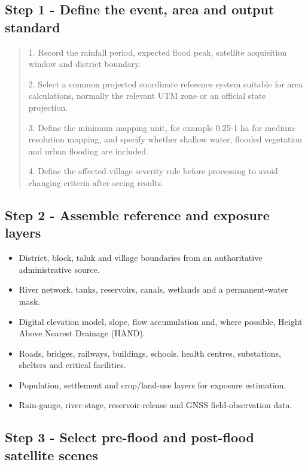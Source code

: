 \documentclass[11pt,a4paper]{article}
\begin{document}
\subsection{Step 1 - Define the event, area and output standard}\label{step-1---define-the-event-area-and-output-standard}

\begin{quote}
1. Record the rainfall period, expected flood peak, satellite acquisition window and district boundary.

2. Select a common projected coordinate reference system suitable for area calculations, normally the relevant UTM zone or an official state projection.

3. Define the minimum mapping unit, for example 0.25-1 ha for medium-resolution mapping, and specify whether shallow water, flooded vegetation and urban flooding are included.

4. Define the affected-village severity rule before processing to avoid changing criteria after seeing results.
\end{quote}

\subsection{Step 2 - Assemble reference and exposure layers}\label{step-2---assemble-reference-and-exposure-layers}

\begin{itemize}
\item
  District, block, taluk and village boundaries from an authoritative administrative source.
\item
  River network, tanks, reservoirs, canals, wetlands and a permanent-water mask.
\item
  Digital elevation model, slope, flow accumulation and, where possible, Height Above Nearest Drainage (HAND).
\item
  Roads, bridges, railways, buildings, schools, health centres, substations, shelters and critical facilities.
\item
  Population, settlement and crop/land-use layers for exposure estimation.
\item
  Rain-gauge, river-stage, reservoir-release and GNSS field-observation data.
\end{itemize}

\subsection{Step 3 - Select pre-flood and post-flood satellite scenes}\label{step-3---select-pre-flood-and-post-flood-satellite-scenes}
\end{document}

